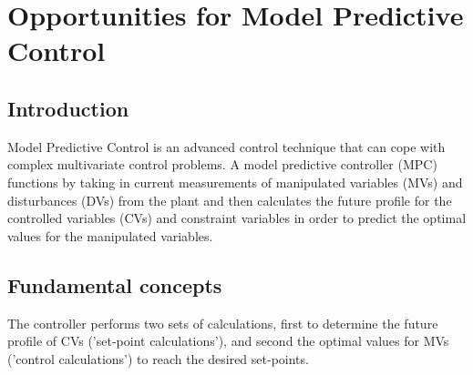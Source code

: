 \section{Opportunities for Model Predictive Control}

\subsection{Introduction}
Model Predictive Control is an advanced control technique that can cope with complex multivariate control problems. A model predictive controller (MPC) functions by taking in current measurements of manipulated variables (MVs) and disturbances (DVs) from the plant and then calculates the future profile for the controlled variables (CVs) and constraint variables in order to predict the optimal values for the manipulated variables. 

\subsection{Fundamental concepts}
The controller performs two sets of calculations, first to determine the future profile of CVs ('set-point calculations'), and second the optimal values for MVs ('control calculations') to reach the desired set-points. 

